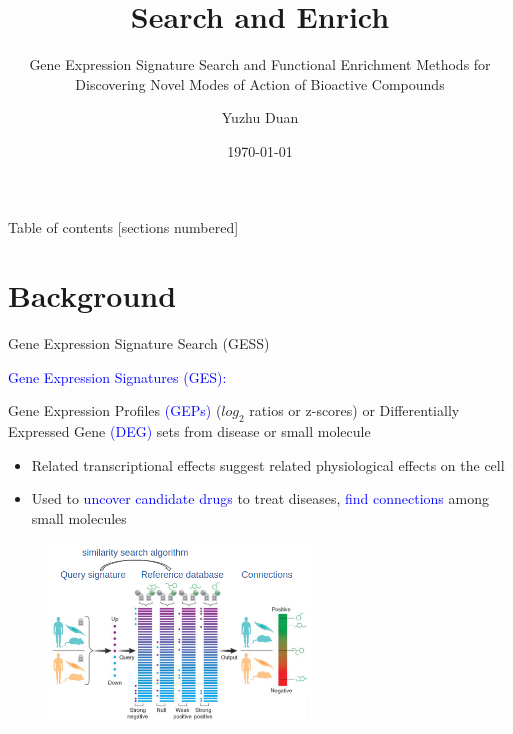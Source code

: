 \documentclass[10pt]{beamer}
\title{Search and Enrich}
\subtitle{Gene Expression Signature Search and Functional Enrichment Methods for Discovering Novel Modes of Action of Bioactive Compounds}
\author{Yuzhu Duan}
\date{\today}
\institute[]{GGB Project Proposal}
\begin{document}
\maketitle
\begin{frame}{Table of contents}
  [sections numbered]
  \tableofcontents[]
\end{frame}
\section{Background}

\begin{frame}[fragile]{Gene Expression Signature Search (GESS)}

    \textcolor{blue}{Gene Expression Signatures (GES):}
    
    \footnotesize{Gene Expression Profiles \textcolor{blue}{(GEPs)} ($log_2$ ratios or z-scores) or Differentially Expressed Gene \textcolor{blue}{(DEG)} sets from disease or small molecule}
    \vspace{-0.2cm}
    \begin{itemize}
    \item Related transcriptional effects suggest related physiological effects on the cell 
    \item Used to \textcolor{blue}{uncover candidate drugs} to treat diseases, \textcolor{blue}{find connections} among small molecules
    \end{itemize}
    \vspace{-0.2cm}
    \begin{figure}
        \includegraphics[width=7cm]{demo/images/gess_workflow.png}
    \end{figure}
    \begin{flushright} 
        \vspace{-0.5cm}
        \scriptsize{\textcolor{gray}{\cite{Lamb2006-du, Michnick2006-sr}}}
    \end{flushright} 
\end{frame}
\end{document}

